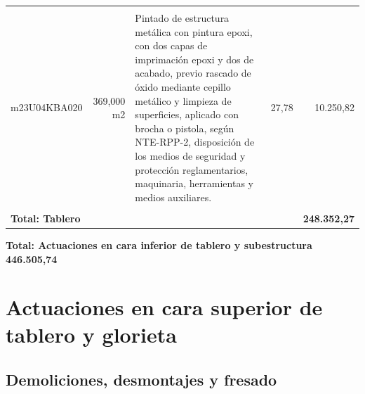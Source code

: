 \documentclass{book}%
\begin{document}
\begin{longtable}{lrlrr}
&&&&\\%
m23U04KBA020&   369,000 m2&\multicolumn{1}{p{5cm}}{Pintado de estructura metálica con pintura epoxi, con dos capas de imprimación epoxi y dos de acabado, previo rascado de óxido mediante cepillo metálico y limpieza de superficies, aplicado con brocha o pistola, según NTE{-}RPP{-}2, disposición de los medios de seguridad y protección reglamentarios, maquinaria, herramientas y medios auxiliares.}&     27,78&10.250,82\\%
&&&&\\%
\multicolumn{4}{p{8cm}}{\textbf{Total: Tablero}}&\textbf{248.352,27}\\%
\end{longtable}%
\normalsize

%
\noindent%
\large%
\textbf{Total: Actuaciones en cara inferior de tablero y subestructura }%
\dotfill%
\textbf{446.505,74}%
\newline%
\normalsize

%
\section{Actuaciones en cara superior de tablero y glorieta}%
\subsection{Demoliciones, desmontajes y fresado}%
\end{document}
